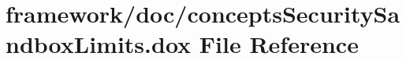 \hypertarget{concepts_security_sandbox_limits_8dox}{}\section{framework/doc/concepts\+Security\+Sandbox\+Limits.dox File Reference}
\label{concepts_security_sandbox_limits_8dox}
